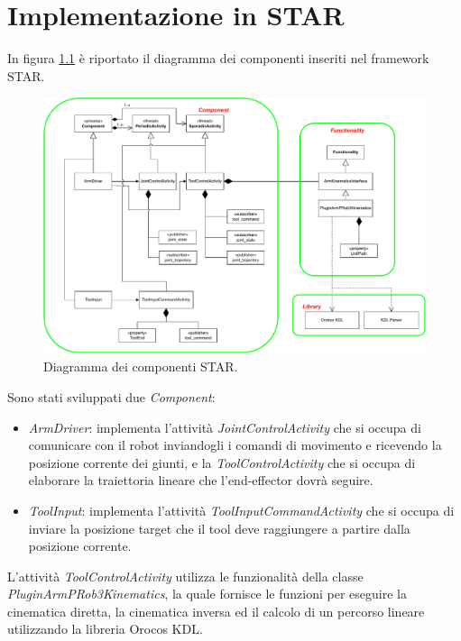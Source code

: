 \chapter{Implementazione in STAR}
In figura \ref{fig:star_diagram} è riportato il diagramma dei componenti inseriti nel framework STAR. 
\begin{figure}[tbh]
	\centering
	\includegraphics[width=1\linewidth]{./ImageFiles/publish_subscribe_architecture.drawio.pdf}
	\caption{Diagramma dei componenti STAR.}
	\label{fig:star_diagram}
\end{figure}

\noindent
Sono stati sviluppati due \textit{Component}:
\begin{itemize}
	\item \textit{ArmDriver}: implementa l'attività \textit{JointControlActivity} che si occupa di comunicare con il robot inviandogli i comandi di movimento e ricevendo la posizione corrente dei giunti, e la \textit{ToolControlActivity} che si occupa di elaborare la traiettoria lineare che l'end-effector dovrà seguire. 
	\item \textit{ToolInput}: implementa l'attività \textit{ToolInputCommandActivity} che si occupa di inviare la posizione target che il tool deve raggiungere a partire dalla posizione corrente.
\end{itemize}
\noindent
L'attività \textit{ToolControlActivity} utilizza le funzionalità della classe \textit{PluginArmPRob3Kinematics}, la quale fornisce le funzioni per eseguire la cinematica diretta, la cinematica inversa ed il calcolo di un percorso lineare utilizzando la libreria Orocos KDL.

